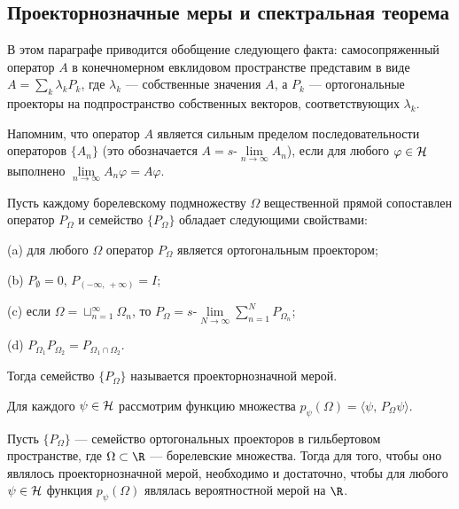 \documentclass[a4paper
]{article}
\begin{document}
\subsection{Проекторнозначные меры и спектральная теорема}
В этом параграфе приводится обобщение следующего факта: самосопряженный
оператор $A$ в конечномерном евклидовом пространстве представим в виде
$A=\sum \limits _k\lambda_kP_k$, где $\lambda_k$ --- собственные
значения $A$, а $P_k$ --- ортогональные проекторы на подпространство
собственных векторов, соответствующих $\lambda_k$. \par
Напомним, что оператор $A$ является сильным пределом последовательности
операторов $\{A_n\}$ (это обозначается $A=s$-$\lim \limits_{n\rightarrow
\infty}A_n$), если для любого $\varphi\in {\cal H}$ выполнено
$\lim \limits _{n\rightarrow \infty}A_n\varphi=A\varphi$.
\begin{Def}
\label{def_pr_meas}
Пусть каждому борелевскому подмножеству $\Omega$ вещественной прямой сопоставлен
оператор $P_{\Omega}$ и семейство $\{P_{\Omega}\}$ обладает следующими
свойствами: \par
(a) для любого $\Omega$ оператор $P_\Omega$ является ортогональным проектором; \par
(b) $P_{\emptyset}=0$, $P_{(-\infty, \, +\infty)}=I$; \par
(c) если $\Omega=\sqcup _{n=1}^\infty \Omega _n$, то $P_\Omega
=s$-$\lim \limits_{N\rightarrow \infty}
\sum \limits_{n=1}^N P_{\Omega_n}$; \par
(d) $P_{\Omega_1}P_{\Omega_2}=P_{\Omega_1\cap\Omega_2}$. \par
Тогда семейство $\{P_{\Omega}\}$ называется проекторнозначной мерой.
\end{Def}
Для каждого $\psi\in {\cal H}$ рассмотрим функцию множества $p_\psi
(\Omega)=\langle \psi, \, P_\Omega \psi\rangle$.
\begin{Sta}
\label{proekt_measure}
Пусть $\{P_\Omega\}$ --- семейство ортогональных проекторов в гильбертовом
пространстве, где $\Omega\subset \R$ --- борелевские множества. Тогда
для того, чтобы оно являлось проекторнозначной мерой, необходимо и
достаточно, чтобы для любого $\psi\in {\cal H}$ функция $p_\psi(\Omega)$
являлась вероятностной мерой на $\R$.
\end{Sta}
\end{document}
